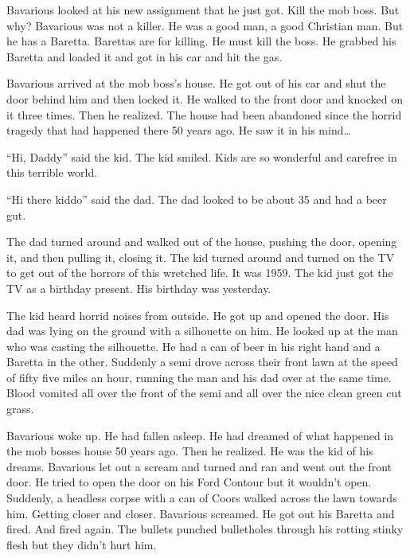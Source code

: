 Bavarious looked at his new assignment that he just got. Kill the
mob boss. But why? Bavarious was not a killer. He was a good man, a
good Christian man. But he has a Baretta. Barettas are for killing.
He must kill the boss. He grabbed his Baretta and loaded it and got
in his car and hit the gas.



Bavarious arrived at the mob boss's house. He got out of his car
and shut the door behind him and then locked it. He walked to the
front door and knocked on it three times. Then he realized. The
house had been abandoned since the horrid tragedy that had happened
there 50 years ago. He saw it in his mind{\ldots}



``Hi, Daddy'' said the kid. The kid smiled. Kids are so wonderful and
carefree in this terrible world.

``Hi there kiddo'' said the dad. The dad looked to be about 35 and
had a beer gut.

The dad turned around and walked out of the house, pushing the
door, opening it, and then pulling it, closing it. The kid turned
around and turned on the TV to get out of the horrors of this
wretched life. It was 1959. The kid just got the TV as a birthday
present. His birthday was yesterday.



The kid heard horrid noises from outside. He got up and opened the
door. His dad was lying on the ground with a silhouette on him. He
looked up at the man who was casting the silhouette. He had a can
of beer in his right hand and a Baretta in the other. Suddenly a
semi drove across their front lawn at the speed of fifty five miles
an hour, running the man and his dad over at the same time. Blood
vomited all over the front of the semi and all over the nice clean
green cut grass.





Bavarious woke up. He had fallen asleep. He had dreamed of what
happened in the mob bosses house 50 years ago. Then he realized. He
was the kid of his dreams. Bavarious let out a scream and turned
and ran and went out the front door. He tried to open the door on
his Ford Contour but it wouldn't open. Suddenly, a headless corpse
with a can of Coors walked across the lawn towards him. Getting
closer and closer. Bavarious screamed. He got out his Baretta and
fired. And fired again. The bullets punched bulletholes through his
rotting stinky flesh but they didn't hurt him.




